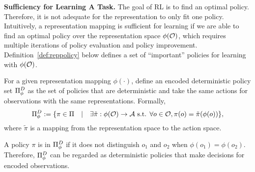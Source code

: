\textbf{Sufficiency for Learning A Task.} The goal of RL is to find an optimal policy. Therefore, it is not adequate for the representation to only fit one policy.
Intuitively, a representation mapping is sufficient for learning if we are able to find an optimal policy over the representation space $\phi(\mathcal{O})$, which requires multiple iterations of policy evaluation and policy improvement.
Definition~\ref{def:reppolicy} below defines a set of ``important'' policies for learning with $\phi(\mathcal{O})$.
\begin{definition}
\label{def:reppolicy}
For a given representation mapping $\phi(\cdot)$, define an encoded deterministic policy set $\Pi_{\phi}^D$ as the set of policies that are deterministic and take the same actions for observations with the same representations. Formally,
\begin{equation}
    \Pi_{\phi}^D := \{ \pi \in \Pi \quad | \quad \exists \tilde{\pi}: \phi(\mathcal{O}) \to \mathcal{A} \text{ s.t. } \forall o\in\mathcal{O}, \pi(o) = \tilde{\pi}(\phi(o))  \},
\end{equation}
where $\tilde{\pi}$ is a mapping from the representation space to the action space.
\end{definition}
A policy $\pi$ is in $\Pi_{\phi}^D$ if it does not distinguish $o_1$ and $o_2$ when $\phi(o_1)=\phi(o_2)$. Therefore, $\Pi_{\phi}^D$ can be regarded as deterministic policies that make decisions for encoded observations. 
